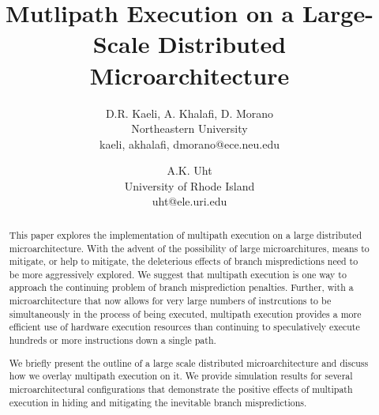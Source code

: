 \documentclass[10pt,twocolumn,dvips]{article}
\begin{document}
\parskip 1mm
%
%
\title{Mutlipath Execution on a Large-Scale Distributed 
Microarchitecture}
%
\author{
D.R. Kaeli, A. Khalafi, D. Morano\\
Northeastern University\\
{kaeli, akhalafi, dmorano}@ece.neu.edu\\
\and
A.K. Uht \\
University of Rhode Island\\ uht@ele.uri.edu
}
%
\date{ }
\maketitle
\date{ }
\thispagestyle{empty}
%
\begin{abstract}
\footnotesize{
This paper explores the implementation of multipath execution on a
large distributed microarchitecture.  With the advent of the
possibility of large microarchitures, means to mitigate, or help to
mitigate, the deleterious effects of branch mispredictions need to be
more aggressively explored.  We suggest that multipath execution is one
way to approach the continuing problem of branch misprediction
penalties.  Further, with a microarchitecture that now allows for very
large numbers of instrcutions to be simultaneously in the process of
being executed, multipath execution provides a more efficient use of
hardware execution resources than continuing to speculatively execute
hundreds or more instructions down a single path.

We briefly present the outline of a large scale distributed microarchitecture
and discuss how we overlay multipath execution on it.
We provide simulation results for several microarchitectural configurations
that demonstrate the positive effects of multipath execution in
hiding and mitigating the inevitable branch mispredictions.
}
\end{abstract}
%
\vspace{-0.2in}
\end{document}

